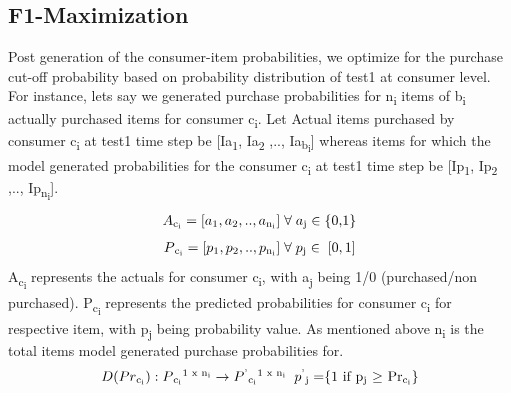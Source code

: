 \subsection{F1-Maximization}
Post generation of the consumer-item probabilities, we optimize for the purchase cut-off probability based on 
probability distribution of test1 at consumer level. For instance, lets say we generated purchase probabilities for 
n\textsubscript{i} items of b\textsubscript{i} actually purchased items for consumer c\textsubscript{i}.
Let Actual items purchased by consumer c\textsubscript{i} at test1 time step be [Ia\textsubscript{1}, Ia\textsubscript{2}
,.., Ia\textsubscript{b\textsubscript{i}}] whereas items for which the model generated probabilities for the 
consumer c\textsubscript{i} at test1 time step be [Ip\textsubscript{1}, Ip\textsubscript{2} ,.., 
Ip\textsubscript{n\textsubscript{i}}]. 
  \begin{equation}
    \begin{array}{l}
      A\textsubscript{c\textsubscript{i}} = [a\textsubscript{1}, a\textsubscript{2}, .., a\textsubscript{n\textsubscript{i}}] 
       \; \forall \; a\textsubscript{j} \in \; $\{0,1\}$
    \end{array}
    \label{eqn:A}
  \end{equation}
  \begin{equation}
    \begin{array}{l}
      P\textsubscript{c\textsubscript{i}} = [p\textsubscript{1}, p\textsubscript{2}, .., p\textsubscript{n\textsubscript{i}}]
      \; \forall \; p\textsubscript{j} \in \; [0,1]
    \end{array}
    \label{eqn:P}
  \end{equation}
A\textsubscript{c\textsubscript{i}} represents the actuals for consumer c\textsubscript{i}, with a\textsubscript{j} being 1/0 
(purchased/non purchased). P\textsubscript{c\textsubscript{i}} represents the predicted probabilities 
for consumer c\textsubscript{i} for respective item, with p\textsubscript{j} being probability value. 
As mentioned above n\textsubscript{i} is the total items model generated purchase probabilities for.
  \begin{equation}
    \begin{array}{l}
      D(Pr\textsubscript{c\textsubscript{i}}) : P\textsubscript{c\textsubscript{i}}\textsuperscript{1 x n\textsubscript{i}}
      \to P\textsuperscript{'}\textsubscript{c\textsubscript{i}}\textsuperscript{1 x n\textsubscript{i}}
      \;\;  p\textsuperscript{'}\textsubscript{j} = $\{1 if p\textsubscript{j} $\geq$ Pr\textsubscript{c\textsubscript{i}}\}$
    \end{array}
    \label{eqn:Decision}
  \end{equation}
